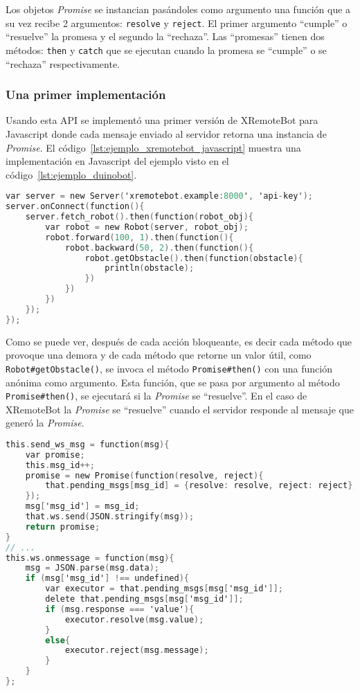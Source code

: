 Los objetos \textit{Promise} se instancian pasándoles como argumento una
función que a su vez recibe 2 argumentos: \texttt{resolve} y \texttt{reject}.
El primer argumento ``cumple'' o ``resuelve'' la promesa y el segundo la
``rechaza''.
Las ``promesas'' tienen dos métodos: \texttt{then} y \texttt{catch} que se
ejecutan cuando la promesa se ``cumple'' o se ``rechaza'' respectivamente.

\subsubsection{Una primer implementación}
Usando esta API se implementó una primer versión de XRemoteBot para Javascript
donde cada mensaje enviado al servidor retorna una instancia de \textit{Promise}.
El código~\ref{lst:ejemplo_xremotebot_javascript} muestra una implementación
en Javascript del ejemplo visto en el código~\ref{lst:ejemplo_duinobot}.

\begin{lstlisting}[language=C,
caption={Ejemplo de XRemoteBot en Javascript},
label=lst:ejemplo_xremotebot_javascript]
var server = new Server('xremotebot.example:8000', 'api-key');
server.onConnect(function(){
    server.fetch_robot().then(function(robot_obj){
        var robot = new Robot(server, robot_obj);
        robot.forward(100, 1).then(function(){
            robot.backward(50, 2).then(function(){
                robot.getObstacle().then(function(obstacle){
                    println(obstacle);
                })
            })
        })
    });
});
\end{lstlisting}

Como se puede ver, después de cada acción bloqueante, es decir cada método que
provoque una demora y de cada método que retorne un valor útil, como
\texttt{Robot\#getObstacle()}, se invoca el método \texttt{Promise\#then()} con
una función anónima como argumento. Esta función, que se pasa por argumento al
método \texttt{Promise\#then()}, se ejecutará si la \textit{Promise} se
``resuelve''. En el caso de
XRemoteBot la \textit{Promise} se ``resuelve'' cuando el servidor
responde al mensaje que generó la \textit{Promise}.

\begin{lstlisting}[language=C,
caption={Ejemplo simplificado de la implementación de XRemoteBot con
Promises dentro del constructor Server en xremotebot.js},
label=lst:ejemplo_xremotebot_javascript_promises]
this.send_ws_msg = function(msg){
    var promise;
    this.msg_id++;
    promise = new Promise(function(resolve, reject){
        that.pending_msgs[msg_id] = {resolve: resolve, reject: reject};
    });
    msg['msg_id'] = msg_id;
    that.ws.send(JSON.stringify(msg));
    return promise;
}
// ...
this.ws.onmessage = function(msg){
    msg = JSON.parse(msg.data);
    if (msg['msg_id'] !== undefined){
        var executor = that.pending_msgs[msg['msg_id']];
        delete that.pending_msgs[msg['msg_id']];
        if (msg.response === 'value'){
            executor.resolve(msg.value);
        }
        else{
            executor.reject(msg.message);
        }
    }
};
\end{lstlisting}

